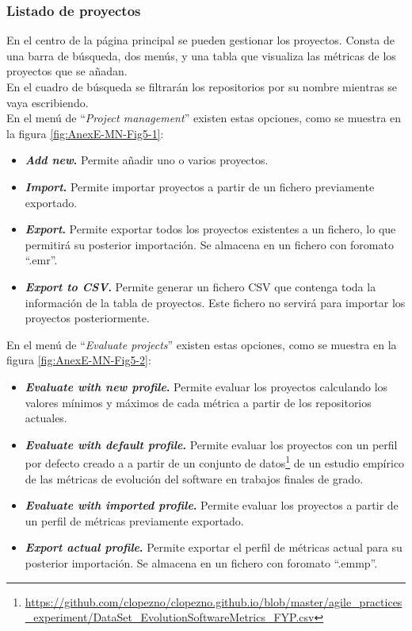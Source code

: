\subsubsection{Listado de proyectos}
En el centro de la página principal se pueden gestionar los proyectos. Consta de una barra de búsqueda, dos menús, y una tabla que visualiza las métricas de los proyectos que se añadan.\\
En el cuadro de búsqueda se filtrarán los repositorios por su nombre mientras se vaya escribiendo.\\
En el menú de ``\textit{Project management}'' existen estas opciones, como se muestra en la figura \ref{fig:AnexE-MN-Fig5-1}:
\begin{itemize}
	\tightlist
	\item \textbf{\textit{Add new}.} Permite añadir uno o varios proyectos.
	\item \textbf{\textit{Import}.} Permite importar proyectos a partir de un fichero previamente exportado.
	\item \textbf{\textit{Export}.} Permite exportar todos los proyectos existentes a un fichero, lo que permitirá su posterior importación. Se almacena en un fichero con foromato ``.emr''.
	\item \textbf{\textit{Export to CSV}.} Permite generar un fichero CSV que contenga toda la información de la tabla de proyectos. Este fichero no servirá para importar los proyectos posteriormente.
\end{itemize}
En el menú de ``\textit{Evaluate projects}'' existen estas opciones, como se muestra en la figura \ref{fig:AnexE-MN-Fig5-2}:
\begin{itemize}
	\tightlist
	\item \textbf{\textit{Evaluate with new profile}.} Permite evaluar los proyectos calculando los valores mínimos y máximos de cada métrica a partir de los repositorios actuales.
	\item \textbf{\textit{Evaluate with default profile}.} Permite evaluar los proyectos con un perfil por defecto creado a a partir de un conjunto de datos\footnote{\url{https://github.com/clopezno/clopezno.github.io/blob/master/agile_practices_experiment/DataSet_EvolutionSoftwareMetrics_FYP.csv}} de un estudio empírico de las métricas de evolución del software en trabajos finales de grado\cite{lopez_portal_2019}.
	\item \textbf{\textit{Evaluate with imported profile}.} Permite evaluar los proyectos a partir de un perfil de métricas previamente exportado.
	\item \textbf{\textit{Export actual profile}.} Permite exportar el perfil de métricas actual para su posterior importación. Se almacena en un fichero con foromato ``.emmp''.
\end{itemize}
